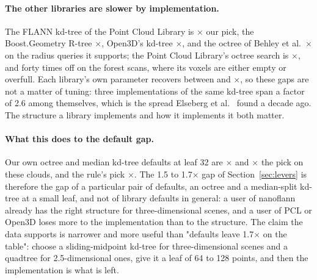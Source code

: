 \paragraph{The other libraries are slower by implementation.} The FLANN kd-tree of the Point Cloud Library is \pclKdAll$\times$ our pick, the Boost.Geometry R-tree \boostAll$\times$, Open3D's kd-tree \openThreeDAll$\times$, and the octree of Behley et al.\ \unibnRadius$\times$ on the radius queries it supports; the Point Cloud Library's octree search is \pclOctreeAll$\times$, and forty times off on the forest scans, where its voxels are either empty or overfull. Each library's own parameter recovers between \libraryLeverMin{} and \libraryLeverMax$\times$, so these gaps are not a matter of tuning: three implementations of the same kd-tree span a factor of 2.6 among themselves, which is the spread Elseberg et al.~\cite{elseberg2012comparison} found a decade ago. The structure a library implements and how it implements it both matter.

\paragraph{What this does to the default gap.} Our own octree and median kd-tree defaults at leaf 32 are \oursOctreeDefaultOverPick$\times$ and \oursKdDefaultOverPick$\times$ the pick on these clouds, and the rule's pick $\times$. The 1.5 to 1.7$\times$ gap of Section~\ref{sec:levers} is therefore the gap of a particular pair of defaults, an octree and a median-split kd-tree at a small leaf, and not of library defaults in general: a user of nanoflann already has the right structure for three-dimensional scenes, and a user of PCL or Open3D loses more to the implementation than to the structure. The claim the data supports is narrower and more useful than "defaults leave 1.7$\times$ on the table": choose a sliding-midpoint kd-tree for three-dimensional scenes and a quadtree for 2.5-dimensional ones, give it a leaf of 64 to 128 points, and then the implementation is what is left.
